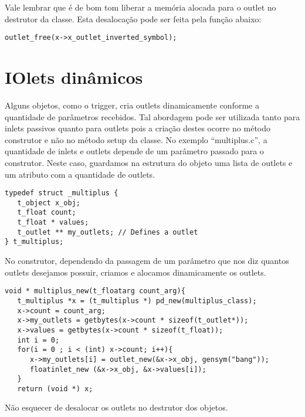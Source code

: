 Vale lembrar que é de bom tom liberar a memória alocada para o outlet no destrutor
da classe.
Esta desalocação pode ser feita pela função abaixo:

\begin{lstlisting}[caption=Desalocando a memória]
   outlet_free(x->x_outlet_inverted_symbol);
\end{lstlisting}

\section{IOlets dinâmicos}
Alguns objetos, como o trigger, cria outlets dinamicamente conforme a quantidade
de parâmetros recebidos.
Tal abordagem pode ser utilizada tanto para inlets passivos quanto para outlets
pois a criação destes ocorre no método construtor e não no método setup da
classe.
No exemplo ``multiplus.c'', a quantidade de inlets e outlets depende de um
parâmetro passado para o construtor.
Neste caso, guardamos na estrutura do objeto uma lista de outlets e um atributo
com a quantidade de outlets.

\begin{lstlisting}[caption=Estrutura de um objeto com outlets dinâmicos]
typedef struct _multiplus {
   t_object x_obj;
   t_float count;
   t_float * values;
   t_outlet ** my_outlets; // Defines a outlet
} t_multiplus;
\end{lstlisting}

No construtor, dependendo da passagem de um parâmetro que nos diz quantos outlets
desejamos possuir, criamos e alocamos dinamicamente os outlets.

\begin{lstlisting}[caption=Criação dinâmica de inlets e outlets]
void * multiplus_new(t_floatarg count_arg){
   t_multiplus *x = (t_multiplus *) pd_new(multiplus_class);
   x->count = count_arg;
   x->my_outlets = getbytes(x->count * sizeof(t_outlet*));
   x->values = getbytes(x->count * sizeof(t_float));
   int i = 0;
   for(i = 0 ; i < (int) x->count; i++){
      x->my_outlets[i] = outlet_new(&x->x_obj, gensym("bang"));
      floatinlet_new (&x->x_obj, &x->values[i]);
   }
   return (void *) x;
\end{lstlisting}

Não esquecer de desalocar os outlets no destrutor dos objetos.

